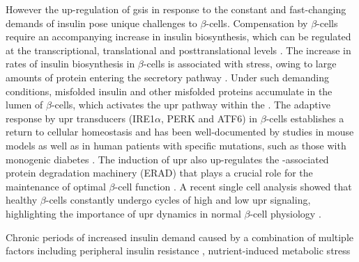 \par However the up-regulation of \gls{gsis} in response to the constant and fast-changing demands of insulin pose unique challenges to $\beta$-cells. Compensation by $\beta$-cells require an accompanying increase in insulin biosynthesis, which can be regulated at the transcriptional, translational and posttranslational levels \textbf{\cite{prentki_islet_2006}}. The increase in rates of insulin biosynthesis in $\beta$-cells is associated with  stress, owing to large amounts of protein entering the secretory pathway \textbf{\cite{yong_therapeutic_2021}}.
Under such demanding conditions, misfolded insulin and other misfolded proteins accumulate in the  lumen of $\beta$-cells, which activates the \gls{upr} pathway within the  \textbf{\cite{miranda_pancreatic_2021}}. The adaptive response by \gls{upr} transducers (IRE1$\alpha$, PERK and ATF6)  in $\beta$-cells establishes a return to cellular homeostasis and has been well-documented by studies in mouse models as well as in human patients with specific mutations, such as those with monogenic diabetes \textbf{\cite{yong_therapeutic_2021}}. The induction of \gls{upr} also up-regulates the -associated protein degradation machinery (ERAD) that plays a crucial role for the maintenance of optimal $\beta$-cell function \textbf{\cite{yong_therapeutic_2021}}. A recent single cell analysis showed that healthy $\beta$-cells constantly undergo cycles of high and low \gls{upr} signaling, highlighting the importance of \gls{upr} dynamics in normal $\beta$-cell physiology \textbf{\cite{xin_pseudotime_2018}}.\\


\par Chronic periods of increased insulin demand caused by a combination of multiple factors including peripheral insulin resistance \textbf{\cite{petersen_mechanisms_2018}}, nutrient-induced metabolic stress \textbf{\cite{prentki_nutrient-induced_2020,cnop_endoplasmic_2017}} 

